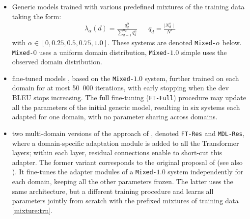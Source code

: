 \documentclass[11pt,a4paper]{article}
\newcommand{\fyTodo}[1]{\Todo[FY:]{\textcolor{orange}{#1}}}
\newcommand{\revision}[1]{\textcolor{red}{#1}}
\newcommand{\system}[1]{\texttt{{#1}}}
\begin{document}
\begin{itemize}
\itemsep0em 
\item Generic models trained with various predefined mixtures of the training data taking the form:
\begin{align} \label{mixture:trn}
\lambda_{\alpha}(d) = \frac{q_d^{\alpha}}{\displaystyle{\mathop{\sum}_{d=1}^{n_d}q_d^{\alpha}}} &&
q_d = \frac{\mid N^{s}_d \mid}{\displaystyle{N^{s}}} %
\end{align} 
with $\alpha \in [0,0.25,0.5,0.75,1.0]$. These systems are denoted \system{Mixed-$\alpha$} below. \system{Mixed-$0$} uses a uniform domain distribution, \system{Mixed-$1.0$} simple uses the observed domain distribution.
\item fine-tuned models \cite{Luong15stanford,Freitag16fast}, based on the \system{Mixed-$1.0$} system, further trained on each domain for at most 50~000 iterations, with early stopping when the dev BLEU stops increasing. The full fine-tuning (\system{FT-Full}) procedure may update all the parameters of the initial generic model, resulting in six systems each adapted for one domain, with no parameter sharing across domains.

\item two multi-domain versions of the approach of , denoted \system{FT-Res} and \system{MDL-Res}, where a domain-specific adaptation module is added to all the Transformer layers; within each layer, residual connections enable to short-cut this adapter. The former variant corresponds to the original proposal of \citet{Bapna19simple} (see also \cite{Sharaf20metalearning}). It fine-tunes the adapter modules of a \system{Mixed-$1.0$} system independently for each domain, keeping all the other parameters frozen. The latter uses the same architecture, but a different training procedure and learns all parameters jointly from scratch with the prefixed mixtures of training data \ref{mixture:trn}.\fyTodo{Keep this ?}
  

\end{itemize}
\end{document}
